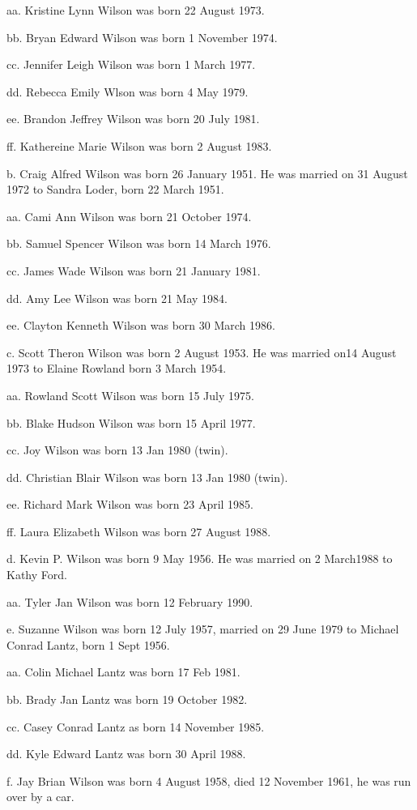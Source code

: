 \documentclass[a4paper]{article}
\begin{document}
aa. Kristine Lynn Wilson was born 22 August 1973.

bb. Bryan Edward Wilson was born 1 November 1974.

cc. Jennifer Leigh Wilson was born 1 March 1977.

dd. Rebecca Emily Wlson was born 4 May 1979.

ee.  Brandon Jeffrey Wilson was born 20 July 1981.

ff.  Kathereine Marie Wilson was born 2 August 1983.  

b. Craig Alfred Wilson was born 26 January 1951.  He was married on 31 August 1972 to Sandra Loder, born 22 March 1951.

aa.  Cami Ann Wilson was born 21 October 1974.

bb. Samuel Spencer Wilson was born 14 March 1976.

cc. James Wade Wilson was born 21 January 1981.

dd. Amy Lee Wilson was born 21 May 1984.

ee. Clayton Kenneth Wilson was born 30 March 1986.

c. Scott Theron Wilson was born 2 August 1953.  He was married on14 August 1973 to Elaine Rowland born 3 March 1954.

aa. Rowland Scott Wilson was born 15 July 1975.

bb. Blake Hudson Wilson was born 15 April 1977.

cc. Joy Wilson was born 13 Jan 1980 (twin).

dd. Christian Blair Wilson was born 13 Jan 1980 (twin).

ee. Richard Mark Wilson was born 23 April 1985.

ff. Laura Elizabeth Wilson was born 27 August 1988.

d. Kevin P. Wilson was born 9 May 1956.  He was married on 2 March1988 to Kathy Ford.

aa. Tyler Jan Wilson was born 12 February 1990.

e. Suzanne Wilson was born 12 July 1957, married on 29 June 1979 to Michael Conrad Lantz, born 1 Sept 1956.

aa. Colin Michael Lantz was born 17 Feb 1981.

bb. Brady Jan Lantz was born 19 October 1982.

cc. Casey Conrad Lantz as born 14 November 1985.

dd. Kyle Edward Lantz was born 30 April 1988.

f. Jay Brian Wilson was born 4 August 1958, died 12 November 1961, he was run over by  a car.
\end{document}
